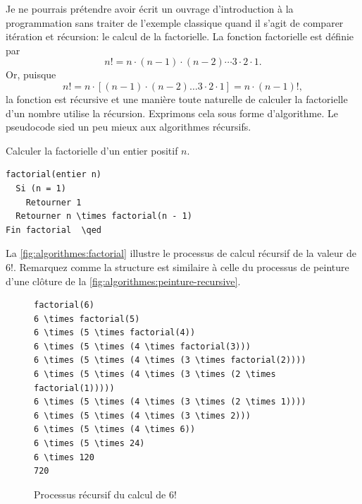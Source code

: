 Je ne pourrais prétendre avoir écrit un ouvrage d'introduction à la
programmation sans traiter de l'exemple classique quand il s'agit de
comparer itération et
récursion: le calcul de la
factorielle. La fonction factorielle est définie
par
\begin{equation*}
  n! = n \cdot (n - 1) \cdot (n - 2) \cdots 3 \cdot 2 \cdot 1.
\end{equation*}
Or, puisque
\begin{equation*}
  n! = n \cdot [(n - 1) \cdot (n - 2) \dots 3 \cdot 2 \cdot 1] =
  n \cdot (n - 1)!,
\end{equation*}
la fonction est récursive et une manière toute naturelle de calculer
la factorielle d'un nombre utilise la récursion. Exprimons cela  sous
forme d'algorithme. Le pseudocode sied un peu mieux aux algorithmes
récursifs.

\begin{algorithme}
  \label{algo:algorithmes:factorielle-recursive}
  Calculer la factorielle d'un entier positif $n$.
  \begin{pseudocode}
\begin{Verbatim}[commandchars=\\\{\}]
factorial(entier n)
  Si (n = 1)
    Retourner 1
  Retourner n \times factorial(n - 1)
Fin factorial  \qed
\end{Verbatim}
  \end{pseudocode}
\end{algorithme}

La \autoref{fig:algorithmes:factorial} illustre le processus de calcul
récursif de la valeur de $6!$. Remarquez comme la structure est
similaire à celle du processus de peinture d'une clôture de la
\autoref{fig:algorithmes:peinture-recursive}.

\begin{figure}
  \centering
  \begin{minipage}{0.67\linewidth}
\begin{Verbatim}[commandchars=\\\{\}]
factorial(6)
6 \times factorial(5)
6 \times (5 \times factorial(4))
6 \times (5 \times (4 \times factorial(3)))
6 \times (5 \times (4 \times (3 \times factorial(2))))
6 \times (5 \times (4 \times (3 \times (2 \times factorial(1)))))
6 \times (5 \times (4 \times (3 \times (2 \times 1))))
6 \times (5 \times (4 \times (3 \times 2)))
6 \times (5 \times (4 \times 6))
6 \times (5 \times 24)
6 \times 120
720
\end{Verbatim}
  \end{minipage}
  \caption{Processus récursif du calcul de $6!$}
  \label{fig:algorithmes:factorial}
\end{figure}

